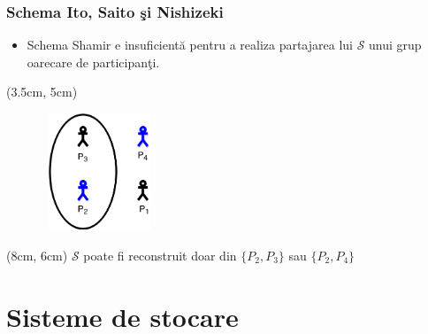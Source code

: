 \documentclass{beamer}
\theoremstyle{definition}
\begin{document}
\begin{frame}
    \frametitle{Schema Ito, Saito \c{s}i Nishizeki}

     {
    \begin{itemize}
        \item Schema Shamir e insuficient\u{a} pentru a realiza partajarea lui $\mathcal{S}$ unui grup oarecare de participan\c{t}i.
    \end{itemize}
    }
     {
        \begin{textblock*}{4cm}(3.5cm, 5cm)
            \begin{figure}
                \includegraphics[width=3.5cm,height=3.5cm,keepaspectratio]{img/shamir/Ito.png}
           \end{figure}
        \end{textblock*}
    }
     {

        \begin{textblock*}{4cm}(8cm, 6cm)
            {$\mathcal{S}$ poate fi reconstruit doar din $\{P_2, P_3\}$ sau $\{P_2, P_4\}$}
        \end{textblock*}  
    }
\end{frame}

\section{Sisteme de stocare}
\end{document}
